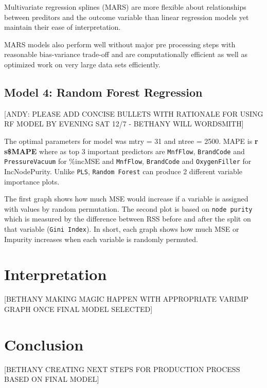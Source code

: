 \documentclass[]{report}
\begin{document}
Multivariate regression splines (MARS) are more flexible about
relationships between preditors and the outcome variable than linear
regression models yet maintain their ease of interpretation.

MARS models also perform well without major pre processing steps with
reasonable bias-variance trade-off and are computationally efficient as
well as optimized work on very large data sets efficiently.

\hypertarget{model-4-random-forest-regression}{%
\section{Model 4: Random Forest
Regression}\label{model-4-random-forest-regression}}

{[}ANDY: PLEASE ADD CONCISE BULLETS WITH RATIONALE FOR USING RF MODEL BY
EVENING SAT 12/7 - BETHANY WILL WORDSMITH{]}

The optimal parameters for model was mtry = 31 and ntree = 2500. MAPE is
\textbf{r s\$MAPE} where as top 3 important predictors are
\texttt{MnfFlow}, \texttt{BrandCode} and \texttt{PressureVacuum} for
\%incMSE and \texttt{MnfFlow}, \texttt{BrandCode} and
\texttt{OxygenFiller} for IncNodePurity. Unlike \texttt{PLS},
\texttt{Random\ Forest} can produce 2 different variable importance
plots.

The first graph shows how much MSE would increase if a variable is
assigned with values by random permutation. The second plot is based on
\texttt{node\ purity} which is measured by the difference between RSS
before and after the split on that variable (\texttt{Gini\ Index}). In
short, each graph shows how much MSE or Impurity increases when each
variable is randomly permuted.

\hypertarget{interpretation}{%
\chapter{Interpretation}\label{interpretation}}

{[}BETHANY MAKING MAGIC HAPPEN WITH APPROPRIATE VARIMP GRAPH ONCE FINAL
MODEL SELECTED{]}

\hypertarget{conclusion}{%
\chapter{Conclusion}\label{conclusion}}

{[}BETHANY CREATING NEXT STEPS FOR PRODUCTION PROCESS BASED ON FINAL
MODEL{]}
\end{document}
